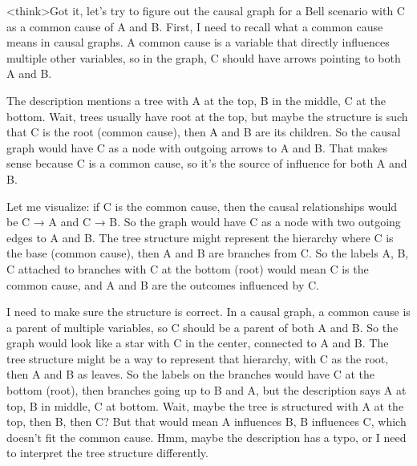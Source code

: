 <think>Got it, let's try to figure out the causal graph for a Bell scenario with C as a common cause of A and B. First, I need to recall what a common cause means in causal graphs. A common cause is a variable that directly influences multiple other variables, so in the graph, C should have arrows pointing to both A and B. 

The description mentions a tree with A at the top, B in the middle, C at the bottom. Wait, trees usually have root at the top, but maybe the structure is such that C is the root (common cause), then A and B are its children. So the causal graph would have C as a node with outgoing arrows to A and B. That makes sense because C is a common cause, so it's the source of influence for both A and B. 

Let me visualize: if C is the common cause, then the causal relationships would be C → A and C → B. So the graph would have C as a node with two outgoing edges to A and B. The tree structure might represent the hierarchy where C is the base (common cause), then A and B are branches from C. So the labels A, B, C attached to branches with C at the bottom (root) would mean C is the common cause, and A and B are the outcomes influenced by C. 

I need to make sure the structure is correct. In a causal graph, a common cause is a parent of multiple variables, so C should be a parent of both A and B. So the graph would look like a star with C in the center, connected to A and B. The tree structure might be a way to represent that hierarchy, with C as the root, then A and B as leaves. So the labels on the branches would have C at the bottom (root), then branches going up to B and A, but the description says A at top, B in middle, C at bottom. Wait, maybe the tree is structured with A at the top, then B, then C? But that would mean A influences B, B influences C, which doesn't fit the common cause. Hmm, maybe the description has a typo, or I need to interpret the tree structure differently. 

